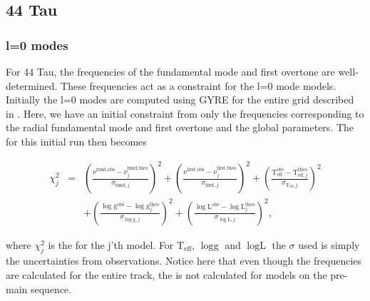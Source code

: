 
\subsection{44 Tau}
\label{sec:chi44}

\subsubsection{l=0 modes}

For 44 Tau, the frequencies of the fundamental mode and first overtone are well-determined. These frequencies act as a constraint for the l=0 mode models. Initially the l=0 modes are computed using GYRE for the entire grid described in . Here, we have an initial constraint from only the frequencies corresponding to the radial fundamental mode and first overtone and the global parameters. The \chis for this initial run then becomes

\begin{align}
\chi^2_j & = & \left(\frac{\nu^{\text{fund,obs}}-\nu_j^{\text{fund,theo}}}{\sigma_{\text{fund},j}}\right)^2 
 + \left(\frac{\nu^{\text{first,obs}}-\nu_j^{\text{first,theo}}}{\sigma_{\text{first},j}}\right)^2 
 +
\left(\frac{\text{T}_\text{eff}^{obs}-\text{T}_{\text{eff},j}^{\text{theo}}}{\sigma_{\text{T}_\text{eff},j}}\right)^2 \\
& & +
\left(\frac{\log \text{g}^\text{obs}-\log \text{g}^\text{theo}_j}{\sigma_{\log \text{g},j}}\right)^2 
 + \left(\frac{\log \text{L}^{\text{obs}}-\log \text{L}^\text{theo}_j}{\sigma_{\log \text{L},j}}\right)^2, 
 \label{eq:chis}
\end{align}

\noindent where $\chi^2_j$ is the \chis for the j'th model. For $\text{T}_{\text{eff}}$, $\log \text{g}$ and $\log \text{L}$ the $\sigma$ used is simply the uncertainties from observations. Notice here that even though the frequencies are calculated for the entire track, the \chis is not calculated for models on the pre-main sequence. 

